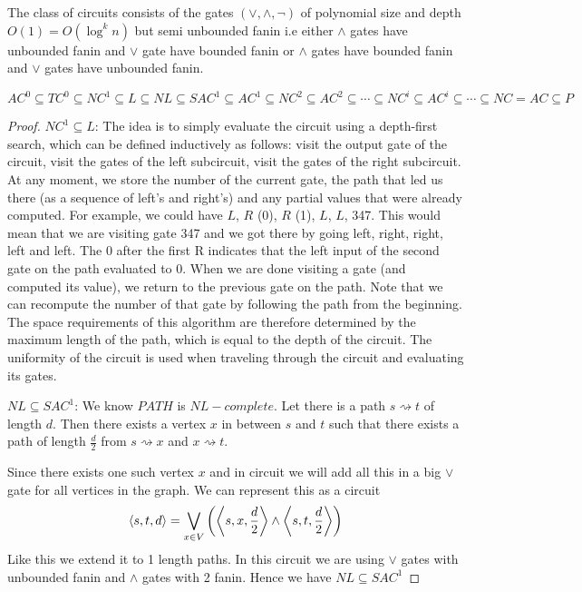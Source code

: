 \begin{definition}[$SAC^k$]
	The class of circuits consists of the gates $(\vee,\wedge,\neg)$  of polynomial size and depth $O(1)=O(\log^k n)$ but semi unbounded fanin i.e either $\wedge$ gates have unbounded fanin and $\vee$ gate have bounded fanin or $\wedge$ gates have bounded fanin and $\vee$ gates have unbounded fanin.
\end{definition}
\begin{theorem}
	$AC^0\subseteq TC^0\subseteq NC^1\subseteq L\subseteq NL\subseteq  SAC^1\subseteq AC^1\subseteq NC^2\subseteq AC^2\subseteq \cdots \subseteq NC^i\subseteq AC^i\subseteq \cdots \subseteq NC=AC\subseteq P$
\end{theorem}
\begin{proof}
	$NC^1\subseteq L$: The idea is to simply evaluate the circuit using a depth-first search, which can be defined inductively as follows: visit the output gate of the circuit, visit the gates of the left subcircuit, visit the gates of the right subcircuit. At any moment, we store the number of the current gate, the path that led us there (as a sequence of left’s and right’s) and any partial values that were already computed. For example, we could have $L$, $R$ (0), $R$ (1), $L$, $L$, 347. This would mean that we are visiting gate 347 and we got there by going left, right, right, left and left. The 0 after the first R indicates that the left input of the second gate on the path evaluated to 0. When we are done visiting a gate (and computed its value), we return to the previous gate on the path. Note that we can recompute the number of that gate by following the path from the beginning. The space requirements of this algorithm are therefore determined by the maximum length of the path, which is equal to the depth of the circuit. The uniformity of the circuit is used when traveling through the circuit and evaluating its gates. 
	
	$NL\subseteq SAC^1$: We know $PATH$ is $NL-complete$. Let there is a path $s\rightsquigarrow t$  of length $d$. Then there exists a vertex $x$ in between $s$ and $t$ such that there exists a path of length $\frac{d}{2}$ from $s\rightsquigarrow x$ and $x\rightsquigarrow t$. 
	\begin{center}
	\end{center}
	Since there exists one such vertex $x$ and in circuit we will add all this in a big $\vee$ gate for all vertices in the graph. We can represent this as a circuit$$\left\langle s,t,d\right\rangle=\bigvee_{x\in V}\left(\left\langle s,x,\frac{d}{2}\right\rangle \wedge \left\langle s,t,\frac{d}{2}\right\rangle\right)$$Like this we extend it to 1 length paths. In this circuit we are using $\vee$ gates with unbounded fanin and $\wedge$ gates with 2 fanin. Hence we have $NL\subseteq SAC^1$
\end{proof}
